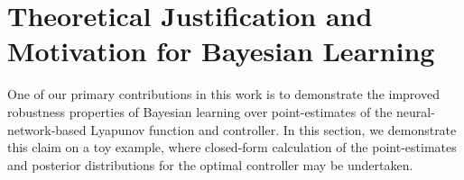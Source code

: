 
\section{Theoretical Justification and Motivation for Bayesian Learning} \label{ssec:justification}
%
One of our primary contributions in this work is to demonstrate the improved
robustness properties of Bayesian learning over point-estimates of the
neural-network-based Lyapunov function and controller. In this section, we
demonstrate this claim on a toy example, where closed-form calculation of the
point-estimates and posterior distributions for the optimal controller may be
undertaken.

